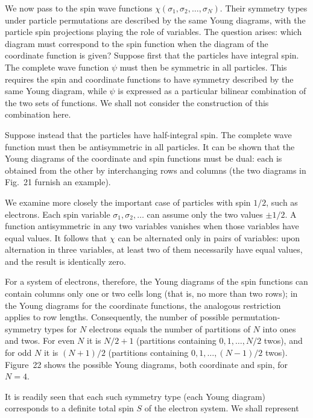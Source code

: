 

We now pass to the spin wave functions $\chi(\sigma_1,\sigma_2,\ldots,\sigma_N)$. Their symmetry types under particle permutations are described by the same Young diagrams, with the particle spin projections playing the role of variables. The question arises: which diagram must correspond to the spin function when the diagram of the coordinate function is given? Suppose first that the particles have integral spin. The complete wave function $\psi$ must then be symmetric in all particles. This requires the spin and coordinate functions to have symmetry described by the same Young diagram, while $\psi$ is expressed as a particular bilinear combination of the two sets of functions. We shall not consider the construction of this combination here.

Suppose instead that the particles have half-integral spin. The complete wave function must then be antisymmetric in all particles. It can be shown that the Young diagrams of the coordinate and spin functions must be dual: each is obtained from the other by interchanging rows and columns (the two diagrams in Fig.~21 furnish an example).

We examine more closely the important case of particles with spin $1/2$, such as electrons. Each spin variable $\sigma_1,\sigma_2,\ldots$ can assume only the two values $\pm1/2$. A function antisymmetric in any two variables vanishes when those variables have equal values. It follows that $\chi$ can be alternated only in pairs of variables: upon alternation in three variables, at least two of them necessarily have equal values, and the result is identically zero.

For a system of electrons, therefore, the Young diagrams of the spin functions can contain columns only one or two cells long (that is, no more than two rows); in the Young diagrams for the coordinate functions, the analogous restriction applies to row lengths. Consequently, the number of possible permutation-symmetry types for $N$ electrons equals the number of partitions of $N$ into ones and twos. For even $N$ it is $N/2+1$ (partitions containing $0,1,\ldots,N/2$ twos), and for odd $N$ it is $(N+1)/2$ (partitions containing $0,1,\ldots,(N-1)/2$ twos). Figure~22 shows the possible Young diagrams, both coordinate and spin, for $N=4$.

It is readily seen that each such symmetry type (each Young diagram) corresponds to a definite total spin $S$ of the electron system. We shall represent

